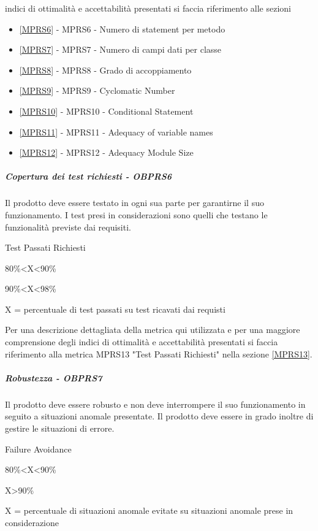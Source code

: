 \documentclass[../PianoDiQualifica.tex]{subfiles}
\begin{document}
					indici di ottimalità e accettabilità presentati si faccia riferimento alle sezioni
					\begin{itemize}
						\item \ref{MPRS6} - MPRS6 - Numero di statement per metodo
						\item \ref{MPRS7} - MPRS7 - Numero di campi dati per classe
						\item \ref{MPRS8} - MPRS8 - Grado di accoppiamento
						\item \ref{MPRS9} - MPRS9 - Cyclomatic Number
						\item \ref{MPRS10} - MPRS10 - Conditional Statement
						\item \ref{MPRS11} - MPRS11 - Adequacy of variable names
						\item \ref{MPRS12} - MPRS12 - Adequacy Module Size
					\end{itemize}
				\subparagraph{Copertura dei test richiesti - OBPRS6}
				Il prodotto deve essere testato in ogni sua parte per garantirne il suo funzionamento. I test presi in considerazioni sono quelli che testano le funzionalità previste dai requisiti. 
					\begin{description}
						\item [Metrica utilizzata:] Test Passati Richiesti
						\item [Soglia di accettabilità:] 80\%<X<90\%
						\item [Soglia di ottimalità:] 90\%<X<98\%
						\item X = percentuale di test passati su test ricavati dai requisti
					\end{description}
			    Per una descrizione dettagliata della metrica qui utilizzata e per una maggiore comprensione degli indici di ottimalità e accettabilità presentati si faccia riferimento alla metrica MPRS13 "Test Passati Richiesti" nella sezione \ref{MPRS13}.
				\subparagraph{Robustezza -  OBPRS7}	
				Il prodotto deve essere robusto e non deve interrompere il suo funzionamento in seguito a situazioni anomale presentate. Il prodotto deve essere in grado inoltre di gestire le situazioni di errore.
					\begin{description}
						\item [Metrica utilizzata:] Failure Avoidance
						\item [Soglia di accettabilità:] 80\%<X<90\%
						\item [Soglia di ottimalità:] X>90\%
						\item X = percentuale di situazioni anomale evitate su situazioni anomale prese in considerazione
					\end{description}
\end{document}
